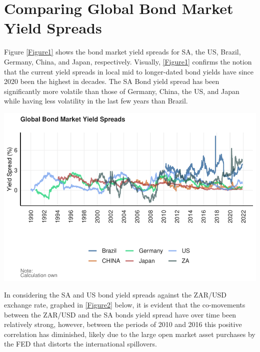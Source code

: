 \documentclass[11pt,preprint, authoryear]{elsarticle}
\let\origfigure\figure
\let\endorigfigure\endfigure
\renewenvironment{figure}[1][2] {
    \expandafter\origfigure\expandafter[H]
} {
    \endorigfigure
}
\numberwithin{equation}{section}
\numberwithin{figure}{section}
\numberwithin{table}{section}
\begin{document}
\headsep 35pt %




\hypertarget{comparing-global-bond-market-yield-spreads}{%
\section{Comparing Global Bond Market Yield
Spreads}\label{comparing-global-bond-market-yield-spreads}}

Figure \ref{Figure1} shows the bond market yield spreads for SA, the US,
Brazil, Germany, China, and Japan, respectively. Visually, \ref{Figure1}
confirms the notion that the current yield spreads in local mid to
longer-dated bond yields have since 2020 been the highest in decades.
The SA Bond yield spread has been significantly more volatile than those
of Germany, China, the US, and Japan while having less volatility in the
last few years than Brazil.

\begin{figure}[H]

{\centering \includegraphics{Question2_files/figure-latex/Global_bonds_plot-1} 

}

\caption{Global Bond Market Yield Spreads \label{Figure1}}\label{fig:Global_bonds_plot}
\end{figure}

In considering the SA and US bond yield spreads against the ZAR/USD
exchange rate, graphed in \ref{Figure2} below, it is evident that the
co-movements between the ZAR/USD and the SA bonds yield spread have over
time been relatively strong, however, between the periods of 2010 and
2016 this positive correlation has diminished, likely due to the large
open market asset purchases by the FED that distorts the international
spillovers.
\end{document}
